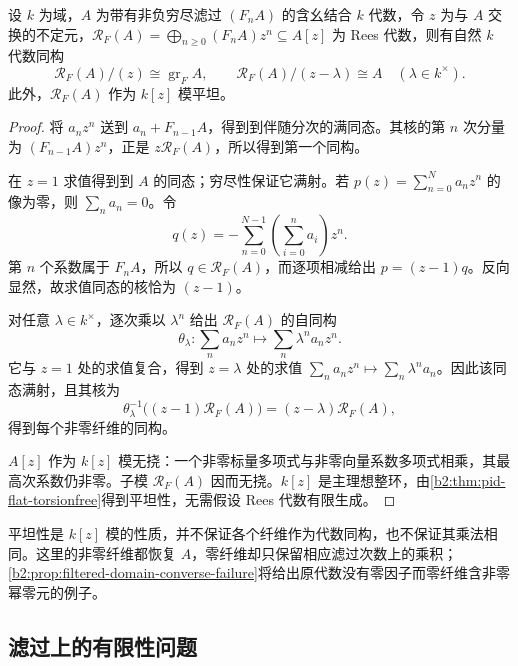 \begin{theorem}\label{b2:thm:rees-fibres}
	设 \(k\) 为域，\(A\) 为带有非负穷尽滤过 \((F_nA)\) 的含幺结合 \(k\) 代数，令 \(z\) 为与 \(A\) 交换的不定元，\(\mathcal R_F(A)=\bigoplus_{n\geq0}(F_nA)z^n\subseteq A[z]\) 为 Rees 代数，则有自然 \(k\) 代数同构
	\[
		\mathcal R_F(A)/(z)\cong\operatorname{gr}_F A, \qquad\mathcal R_F(A)/(z-\lambda)\cong A\quad(\lambda\in k^\times).
	\]
	此外，\(\mathcal R_F(A)\) 作为 \(k[z]\) 模平坦。
\end{theorem}
\begin{proof}
	将 \(a_nz^n\) 送到 \(a_n+F_{n-1}A\)，得到到伴随分次的满同态。其核的第 \(n\) 次分量为 \((F_{n-1}A)z^n\)，正是 \(z\mathcal R_F(A)\)，所以得到第一个同构。

	在 \(z=1\) 求值得到到 \(A\) 的同态；穷尽性保证它满射。若 \(p(z)=\sum_{n=0}^N a_nz^n\) 的像为零，则 \(\sum_n a_n=0\)。令
	\[
		q(z)=-\sum_{n=0}^{N-1}\left(\sum_{i=0}^n a_i\right)z^n.
	\]
	第 \(n\) 个系数属于 \(F_nA\)，所以 \(q\in\mathcal R_F(A)\)，而逐项相减给出 \(p=(z-1)q\)。反向显然，故求值同态的核恰为 \((z-1)\)。

	对任意 \(\lambda\in k^\times\)，逐次乘以 \(\lambda^n\) 给出 \(\mathcal R_F(A)\) 的自同构
	\[
		\theta_\lambda\colon\sum_n a_nz^n\longmapsto\sum_n\lambda^na_nz^n.
	\]
	它与 \(z=1\) 处的求值复合，得到 \(z=\lambda\) 处的求值 \(\sum_n a_nz^n\mapsto\sum_n\lambda^na_n\)。因此该同态满射，且其核为
	\[
		\theta_\lambda^{-1}\bigl((z-1)\mathcal R_F(A)\bigr) = (z-\lambda)\mathcal R_F(A),
	\]
	得到每个非零纤维的同构。

	\(A[z]\) 作为 \(k[z]\) 模无挠：一个非零标量多项式与非零向量系数多项式相乘，其最高次系数仍非零。子模 \(\mathcal R_F(A)\) 因而无挠。\(k[z]\) 是主理想整环，由\cref{b2:thm:pid-flat-torsionfree}得到平坦性，无需假设 Rees 代数有限生成。
\end{proof}

平坦性是 \(k[z]\) 模的性质，并不保证各个纤维作为代数同构，也不保证其乘法相同。这里的非零纤维都恢复 \(A\)，零纤维却只保留相应滤过次数上的乘积；\cref{b2:prop:filtered-domain-converse-failure}将给出原代数没有零因子而零纤维含非零幂零元的例子。

\subsection{滤过上的有限性问题}
\label{b2:subsec:2001:03}

